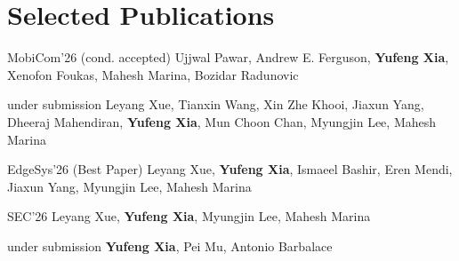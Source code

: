 \section{Selected Publications}
\vspace{0pt}

  {MobiCom'26 (cond. accepted)}
  {Ujjwal Pawar, Andrew E. Ferguson, \textbf{Yufeng Xia}, Xenofon Foukas, Mahesh Marina, Bozidar Radunovic}

  {under submission}
  {Leyang Xue, Tianxin Wang, Xin Zhe Khooi, Jiaxun Yang, Dheeraj Mahendiran, \textbf{Yufeng Xia}, Mun Choon Chan, Myungjin Lee, Mahesh Marina}

  {EdgeSys'26 (Best Paper)}
  {Leyang Xue, \textbf{Yufeng Xia}, Ismaeel Bashir, Eren Mendi, Jiaxun Yang, Myungjin Lee, Mahesh Marina}

  {SEC'26}
  {Leyang Xue, \textbf{Yufeng Xia}, Myungjin Lee, Mahesh Marina}

  {under submission}
  {\textbf{Yufeng Xia}, Pei Mu, Antonio Barbalace}
